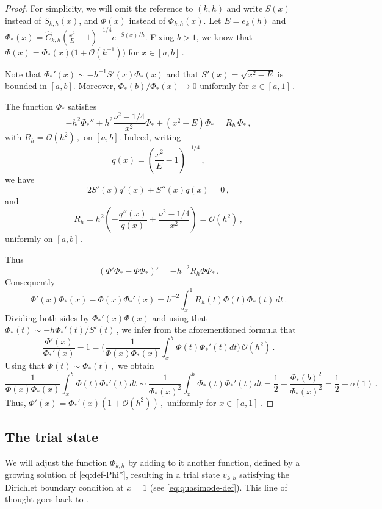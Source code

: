 \documentclass[11pt]{amsart}
\numberwithin{equation}{section}
\theoremstyle{remark}
\begin{document}
\begin{proof}
For simplicity, we will omit the reference to $(k,h)$ and write $S(x)$ instead of $S_{k,h}(x)$, and $\Phi(x)$ instead of $\Phi_{k,h}(x)$. Let $E=e_k(h)$ and $\Phi_*(x)=\hat C_{k,h}
	\left(\frac{x^2}{E}-1\right)^{-1/4}
	e^{-S(x)/h}.$ Fixing $b>1$, we know that $\Phi(x)= \Phi_*(x)\big(1+\mathcal O(k^{-1})\big)$ for $x\in[a,b]\,$. 


Note that $\Phi_*'(x)\sim -h^{-1}S'(x)\Phi_*(x)$ and that $S'(x)=\sqrt{x^2-E}$ is bounded in $[a,b]$. Moreover, $\Phi_*(b)/\Phi_*(x)\to0$ uniformly for $x\in[a,1]$\,.

The function $\Phi_*$ satisfies
\[-h^2\Phi_*''+h^2\frac{\nu^2-1/4}{x^2}\Phi_*+(x^2-E)\Phi_*=R_h \,\Phi_*\,,\]
with $R_h=\mathcal O(h^2)\,,$ on $[a,b].$ Indeed, writing
	\[
	q(x)=\left(\frac{x^2}{E}-1\right)^{-1/4}\,,
	\]
	we have
	\[
	2S'(x)q'(x)+S''(x)q(x)=0\,,
	\]
	and
	\[
	R_h
	=
	h^2\left(
	-\frac{q''(x)}{q(x)}
	+\frac{\nu^2-1/4}{x^2}
	\right)
	=\mathcal O(h^2)\,,
	\]
	uniformly on $[a,b]$\,.

Thus
\[(\Phi'\Phi_*-\Phi\Phi_*)'=-h^{-2}R_h\Phi\Phi_*\,.\]
Consequently
\[\Phi'(x)\Phi_*(x)-\Phi(x)\Phi_*'(x)=h^{-2}\int_{x}^{1}R_h(t)\Phi(t)\Phi_*(t)\,dt\,.\]
Dividing both sides by $\Phi_*'(x)\Phi(x)$ and using that $\Phi_*(t)\sim -h \Phi_*'(t)/S'(t)\,$, we infer from the aforementioned formula that
\[\frac{\Phi'(x)}{\Phi_*'(x)}-1=\Big(\frac{1}{\Phi(x)\Phi_*(x)}\int_{x}^{b} \Phi(t)\Phi_*'(t)dt \Big)\, \mathcal O(h^2)\,. \]
%
%
%
%
%
Using that $\Phi(t)\sim\Phi_*(t)\,,$ we obtain
\[\frac{1}{\Phi(x)\Phi_*(x)}\int_{x}^{b} \Phi(t)\Phi_*'(t)dt\sim\frac{1}{\Phi_*(x)^2}\int_{x}^{b} \Phi_*(t)\Phi_*'(t)dt=\frac12-\frac{\Phi_*(b)^2}{\Phi_*(x)^2}=\frac12+o(1)\,.\]
Thus, $\Phi'(x)=\Phi_*'(x)(1+\mathcal O(h^2))\,,$ uniformly for $x\in[a,1]\,$.
%
\end{proof}
%

\subsection{The trial state}\label{subsec:trial-state}

We will adjust the function $\Phi_{k,h}$ by adding to it another function, defined by a growing solution of \eqref{eq:def-Phi*},  resulting in a trial state $v_{k,h}$ satisfying the Dirichlet boundary condition at $x=1$ (see \eqref{eq:quasimode-def}). This line of thought goes back to \cite{Bo,BoHe}.
\end{document}
